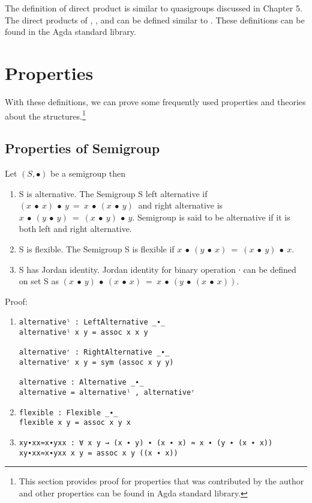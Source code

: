 The definition of direct product is similar to quasigroups discussed in Chapter
5. The direct products of , , and
 can be defined similar to . These
definitions can be found in the Agda standard library.

\section{Properties}
With these definitions, we can prove some frequently used properties and theories
about the structures.\footnote{This section provides proof for properties that
was contributed by the author and other properties can be found in Agda standard
library.}
\subsection{Properties of Semigroup}
Let $(S, ∙)$ be a semigroup then
\begin{enumerate}
\item S is alternative. The Semigroup S left alternative if \((x\ ∙\ x)\ ∙\ y\ =\ x\ ∙\ (x\ ∙\ y)\ \) and right alternative is
\(x\ ∙\ (y\ ∙\ y)\ =\ (x\ ∙\ y)\ ∙\ y\). Semigroup is
said to be alternative if it is both left and right alternative. 
\item S is flexible. The Semigroup S is flexible if \(x\ ∙\ (y\
∙\ x)\ =\ (x\ ∙\ y)\ ∙\ x\).
\item S has Jordan identity.  Jordan identity for binary operation ∙ can be
defined on set S as \((x\ ∙\ y)\ ∙\ (x\ ∙\ x)\ =\
x\ ∙\ (y\ ∙\ (x\ ∙\ x)). \)
\end{enumerate}
Proof:
\begin{enumerate}
\item
\begin{verbatim}
alternativeˡ : LeftAlternative _∙_
alternativeˡ x y = assoc x x y

alternativeʳ : RightAlternative _∙_
alternativeʳ x y = sym (assoc x y y)

alternative : Alternative _∙_
alternative = alternativeˡ , alternativeʳ
\end{verbatim}
 \item
\begin{verbatim}
flexible : Flexible _∙_
flexible x y = assoc x y x
\end{verbatim}
\item
\begin{verbatim}
xy∙xx≈x∙yxx : ∀ x y → (x ∙ y) ∙ (x ∙ x) ≈ x ∙ (y ∙ (x ∙ x))
xy∙xx≈x∙yxx x y = assoc x y ((x ∙ x))
\end{verbatim}
\end{enumerate}
